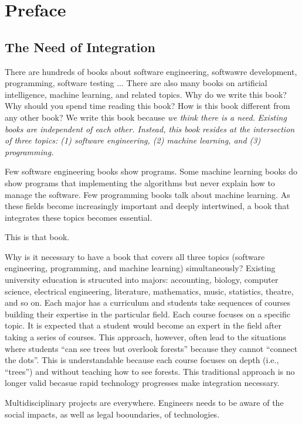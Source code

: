 \chapter*{Preface}

\section*{The Need of Integration}

There are hundreds of books about software engineering, softwawre
development, programming, software testing ...  There are also many
books on artificial intelligence, machine learning, and related
topics.  Why do we write this book?  Why should you spend time reading
this book?  How is this book different from any other book?  We write
this book because {\it we think there is a need.}  {\it Existing books
  are independent of each other.  Instead, this book resides at the
  intersection of three topics: (1) software engineering, (2) machine
  learning, and (3) programming.  }


Few software engineering books show programs. Some machine learning
books do show programs that implementing the algorithms but never
explain how to manage the software.  Few programming books talk about
machine learning.  As these fields become increasingly important and
deeply intertwined, a book that integrates these topics becomes
essential.

This is that book.

Why is it necessary to have a book that covers all three topics
(software engineering, programming, and machine learning)
simultaneously?  Existing university education is strucuted into
majors: accounting, biology, computer science, electrical engineering,
literature, mathematics, music, statistics, theatre, and so on.  Each
major has a curriculum and students take sequences of courses building
their expertise in the particular field. Each course focuses on a
specific topic.  It is expected that a student would become an expert
in the field after taking a series of courses.  This approach,
however, often lead to the situations where students ``can see trees but
overlook forests'' because they cannot ``connect the dots''.  This is
understandable because each course focuses on depth (i.e., ``trees'')
and without teaching how to see forests.  This traditional approach is
no longer valid becasue rapid technology progresses make integration
necessary.

Multidisciplinary projects are everywhere. Engineers needs to be aware
of the social impacts, as well as legal booundaries, of technologies.

